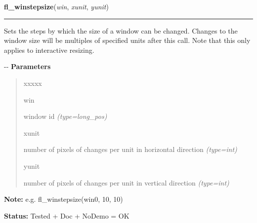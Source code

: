 \hspace{.8\funcindent}\begin{boxedminipage}{\funcwidth}

    \raggedright \textbf{fl\_winstepsize}(\textit{win}, \textit{xunit}, \textit{yunit})

    \vspace{-1.5ex}

    \rule{\textwidth}{0.5\fboxrule}
\setlength{\parskip}{2ex}

Sets the steps by which the size of a window can be changed. Changes
to the window size will be multiples of specified units after this
call. Note that this only applies to interactive resizing.

-{}-
\setlength{\parskip}{1ex}
      \textbf{Parameters}
      \vspace{-1ex}

      \begin{quote}
        \begin{Ventry}{xxxxx}

          \item[win]


window id
            {\it (type=long\_pos)}

          \item[xunit]


number of pixels of changes per unit in horizontal direction
            {\it (type=int)}

          \item[yunit]


number of pixels of changes per unit in vertical direction
            {\it (type=int)}

        \end{Ventry}

      \end{quote}

\textbf{Note:} 
e.g. fl\_winstepsize(win0, 10, 10)


\textbf{Status:} 
Tested + Doc + NoDemo = OK


    \end{boxedminipage}

    \label{xformslib:flxbasic:fl_winstepsize}

    \vspace{0.5ex}

